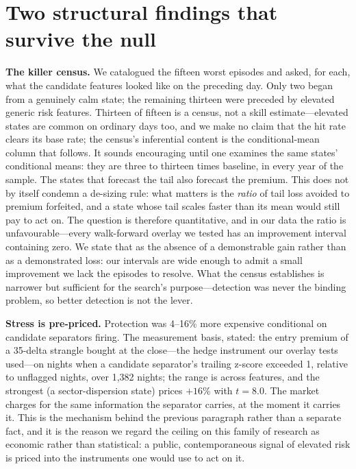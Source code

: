 \documentclass[11pt]{article}
\begin{document}
\section{Two structural findings that survive the null}
\textbf{The killer census.} We catalogued the fifteen worst episodes and asked, for each, what
the candidate features looked like on the preceding day. Only two began from a genuinely calm
state; the remaining thirteen were preceded by elevated generic risk features. Thirteen of
fifteen is a census, not a skill estimate---elevated states are common on ordinary days too,
and we make no claim that the hit rate clears its base rate; the census's inferential content
is the conditional-mean column that follows. It sounds
encouraging until one examines the same states' conditional means: they are three to thirteen
times baseline, in every year of the sample. The states that forecast the tail also forecast
the premium. This does not by itself condemn a de-sizing rule: what matters is the \emph{ratio}
of tail loss avoided to premium forfeited, and a state whose tail scales faster than its mean
would still pay to act on. The question is therefore quantitative, and in our data the ratio is
unfavourable---every walk-forward overlay we tested has an improvement interval containing zero.
We state that as the absence of a demonstrable gain rather than as a demonstrated loss: our
intervals are wide enough to admit a small improvement we lack the episodes to resolve. What
the census establishes is narrower but sufficient for the search's purpose---detection was never
the binding problem, so better detection is not the lever.

\textbf{Stress is pre-priced.} Protection was 4--16\% more
expensive conditional on candidate separators firing. The measurement basis, stated: the entry
premium of a 35-delta strangle bought at the close---the hedge instrument our overlay tests
used---on nights when a candidate separator's trailing z-score exceeded 1, relative to
unflagged nights, over 1{,}382 nights; the range is across features, and the strongest (a
sector-dispersion state) prices $+16\%$ with $t = 8.0$. The market charges for the same
information the separator carries, at the moment it carries it. This is the mechanism behind
the previous paragraph rather than a separate fact, and it is the reason we regard the ceiling
on this family of research as economic rather than statistical: a public, contemporaneous
signal of elevated risk is priced into the instruments one would use to act on it.
\end{document}
